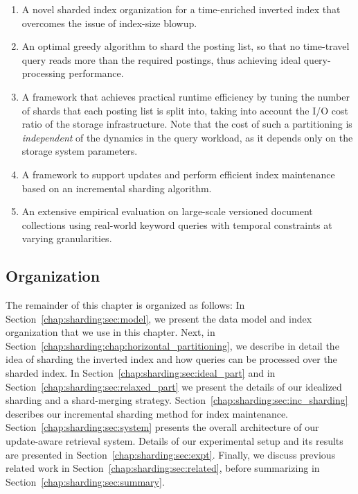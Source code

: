 \begin{enumerate}
	\item A novel sharded index organization for a
	  time-enriched inverted index that overcomes the issue of
	  index-size blowup.

	\item An optimal greedy algorithm to shard the posting list, so that no time-travel query reads more than the required postings, thus achieving ideal query-processing performance.

	\item A framework that achieves practical runtime efficiency by tuning the number of shards that each posting list is split into, taking into
	  account the I/O cost ratio of the storage infrastructure. Note
	  that the cost of such a partitioning is \emph{independent} of the dynamics in the
	  query workload, as it depends only on the storage system parameters.

    \item A framework to support updates and perform efficient index maintenance based on an incremental sharding algorithm.

    \item An extensive empirical evaluation on large-scale versioned
	document collections using real-world keyword queries with temporal constraints at varying granularities. 

\end{enumerate}

\subsection{Organization}
The remainder of this chapter is organized as follows: In
Section~\ref{chap:sharding:sec:model}, we present the data model 
and index organization that we use in this chapter. Next, in 
Section~\ref{chap:sharding:chap:horizontal_partitioning}, we describe in detail the idea of 
sharding the inverted index and how queries can be processed over the sharded 
index. In Section~\ref{chap:sharding:sec:ideal_part} and in 
Section~\ref{chap:sharding:sec:relaxed_part} we present the details of our idealized sharding and 
a shard-merging strategy. 
Section~\ref{chap:sharding:sec:inc_sharding} describes our incremental sharding method for 
index maintenance. Section~\ref{chap:sharding:sec:system} presents the overall 
architecture of our update-aware retrieval system. Details of our 
experimental setup and its results are presented in Section~\ref{chap:sharding:sec:expt}. 
Finally, we discuss previous related work in Section~\ref{chap:sharding:sec:related}, 
before summarizing in Section~\ref{chap:sharding:sec:summary}.


